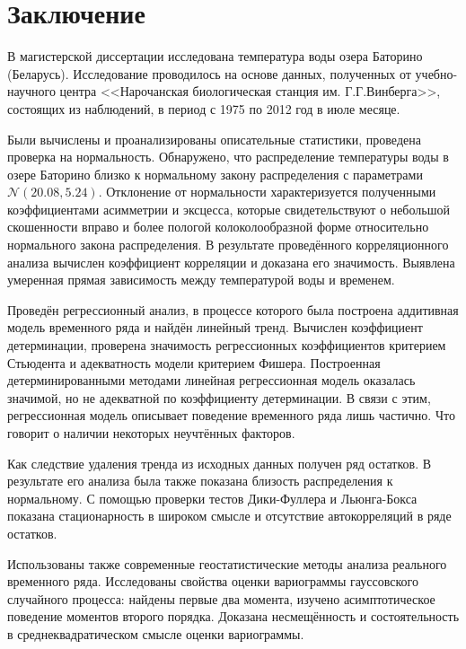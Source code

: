 
\chapter*{Заключение}

В магистерской диссертации исследована температура воды озера Баторино (Беларусь). Исследование проводилось на основе данных, полученных от учебно-научного центра <<Нарочанская биологическая станция им. Г.Г.Винберга>>, состоящих из наблюдений, в период с 1975 по 2012 год в июле месяце.

Были вычислены и проанализированы описательные статистики, проведена проверка на нормальность. Обнаружено, что распределение температуры воды в озере Баторино близко к нормальному закону распределения с параметрами $ \mathcal{N}(20.08, 5.24) $. Отклонение от нормальности характеризуется полученными коэффициентами асимметрии и эксцесса, которые свидетельствуют о небольшой скошенности вправо и более пологой колоколообразной форме относительно нормального закона распределения. В результате проведённого корреляционного анализа вычислен коэффициент корреляции и доказана его значимость. Выявлена умеренная прямая зависимость между температурой воды и временем.

Проведён регрессионный анализ, в процессе которого была построена аддитивная модель временного ряда и найдён линейный тренд. Вычислен коэффициент детерминации, проверена значимость регрессионных коэффициентов критерием Стьюдента и адекватность модели критерием Фишера. Построенная детерминированными методами линейная регрессионная модель оказалась значимой, но не адекватной по коэффициенту детерминации. В связи с этим, регрессионная модель описывает поведение временного ряда лишь частично. Что говорит о наличии некоторых неучтённых факторов.

Как следствие удаления тренда из исходных данных получен ряд остатков. В результате его анализа была также показана близость распределения к нормальному. С помощью проверки тестов Дики-Фуллера и Льюнга-Бокса показана стационарность в широком смысле и отсутствие автокорреляций в ряде остатков.

Использованы также современные геостатистические методы анализа реального временного ряда. Исследованы свойства оценки вариограммы гауссовского случайного процесса: найдены первые два момента, изучено асимптотическое поведение моментов второго порядка. Доказана несмещённость и состоятельность в среднеквадратическом смысле оценки вариограммы.

